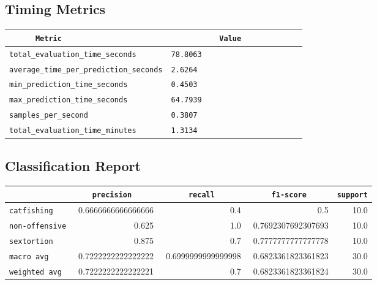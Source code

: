 \documentclass{article}
\begin{document}
\subsection{Timing Metrics}

\begin{center}
\begin{tabular}{l | l} \hline
    \verb|      Metric     | & \verb|           Value           | \\ \hline
    \hline
    \verb|total_evaluation_time_seconds| & \verb|78.8063                      | \\ \hline
    \verb|average_time_per_prediction_seconds| & \verb|2.6264                       | \\ \hline
    \verb|min_prediction_time_seconds| & \verb|0.4503                       | \\ \hline
    \verb|max_prediction_time_seconds| & \verb|64.7939                      | \\ \hline
    \verb|samples_per_second| & \verb|0.3807                       | \\ \hline
    \verb|total_evaluation_time_minutes| & \verb|1.3134                       | \\ \hline
\end{tabular}
\end{center}

\subsection{Classification Report}

\begin{center}
\begin{tabular}{l | r | r | r | r} \hline
    \verb|            | & \verb|    precision     | & \verb|      recall      | & \verb|     f1-score     | & \verb|support| \\ \hline
    \hline
    \verb|catfishing | & 0.6666666666666666 & 0.4 & 0.5 &    10.0 \\ \hline
    \verb|non-offensive| & 0.625 & 1.0 & 0.7692307692307693 &    10.0 \\ \hline
    \verb|sextortion | & 0.875 & 0.7 & 0.7777777777777778 &    10.0 \\ \hline
    \verb|macro avg  | & 0.7222222222222222 & 0.6999999999999998 & 0.6823361823361823 &    30.0 \\ \hline
    \verb|weighted avg| & 0.7222222222222221 & 0.7 & 0.6823361823361824 &    30.0 \\ \hline
\end{tabular}
\end{center}
\end{document}
